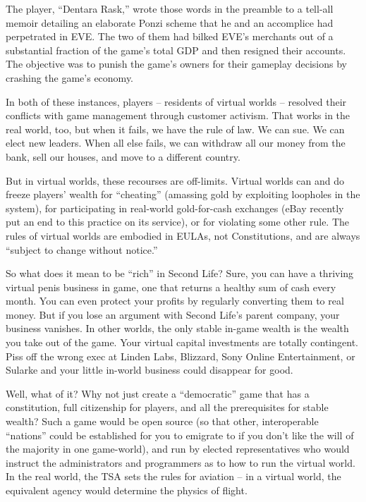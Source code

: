 The player, ``Dentara Rask,'' wrote those words in the preamble to a
tell-all memoir detailing an elaborate Ponzi scheme that he and an
accomplice had perpetrated in EVE. The two of them had bilked EVE's
merchants out of a substantial fraction of the game's total GDP and
then resigned their accounts. The objective was to punish the
game's owners for their gameplay decisions by crashing the game's
economy.

In both of these instances, players -- residents of virtual worlds
-- resolved their conflicts with game management through customer
activism. That works in the real world, too, but when it fails, we
have the rule of law. We can sue. We can elect new leaders. When
all else fails, we can withdraw all our money from the bank, sell
our houses, and move to a different country.

But in virtual worlds, these recourses are off-limits. Virtual
worlds can and do freeze players' wealth for ``cheating'' (amassing
gold by exploiting loopholes in the system), for participating in
real-world gold-for-cash exchanges (eBay recently put an end to
this practice on its service), or for violating some other rule.
The rules of virtual worlds are embodied in EULAs, not
Constitutions, and are always ``subject to change without notice.''

So what does it mean to be ``rich'' in Second Life? Sure, you can
have a thriving virtual penis business in game, one that returns a
healthy sum of cash every month. You can even protect your profits
by regularly converting them to real money. But if you lose an
argument with Second Life's parent company, your business vanishes.
In other worlds, the only stable in-game wealth is the wealth you
take out of the game. Your virtual capital investments are totally
contingent. Piss off the wrong exec at Linden Labs, Blizzard, Sony
Online Entertainment, or Sularke and your little in-world business
could disappear for good.

Well, what of it? Why not just create a ``democratic'' game that has
a constitution, full citizenship for players, and all the
prerequisites for stable wealth? Such a game would be open source
(so that other, interoperable ``nations'' could be established for
you to emigrate to if you don't like the will of the majority in
one game-world), and run by elected representatives who would
instruct the administrators and programmers as to how to run the
virtual world. In the real world, the TSA sets the rules for
aviation -- in a virtual world, the equivalent agency would
determine the physics of flight.

